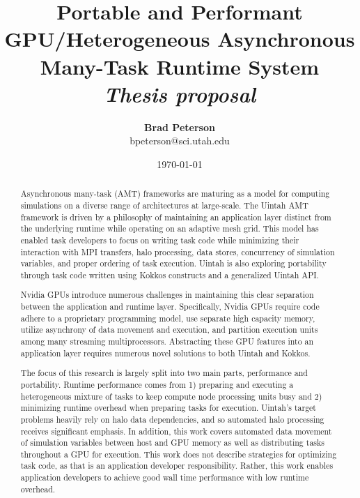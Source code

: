 \documentclass[12pt]{article}
\title{{\bf Portable and Performant GPU/Heterogeneous Asynchronous Many-Task Runtime System} \\
\it Thesis proposal}
\author{ {\bf Brad Peterson}  \\
{\small bpeterson@sci.utah.edu}
}
\date{\today}
\begin{document}
\pagestyle{plain}
\maketitle

\pagebreak
\begin{abstract}

Asynchronous many-task (AMT) frameworks are maturing as a model for computing simulations on a diverse range of architectures at large-scale.  The Uintah AMT framework is driven by a philosophy of maintaining an application layer distinct from the underlying runtime while operating on an adaptive mesh grid.  This model has enabled task developers to focus on writing task code while minimizing their interaction with MPI transfers, halo processing, data stores, concurrency of simulation variables, and proper ordering of task execution.   Uintah is also exploring portability through task code written using Kokkos constructs and a generalized Uintah API.  

Nvidia GPUs introduce numerous challenges in maintaining this clear separation between the application and runtime layer.  Specifically, Nvidia GPUs require code adhere to a proprietary programming model, use separate high capacity memory, utilize asynchrony of data movement and execution, and partition execution units among many streaming multiprocessors.  Abstracting these GPU features into an application layer requires numerous novel solutions to both Uintah and Kokkos.  

The focus of this research is largely split into two main parts, performance and portability.  Runtime performance comes from 1) preparing and executing a heterogeneous mixture of tasks to keep compute node processing units busy and 2) minimizing runtime overhead when preparing tasks for execution.  Uintah's target problems heavily rely on halo data dependencies, and so automated halo processing receives significant emphasis.  In addition, this work covers automated data movement of simulation variables between host and GPU memory as well as distributing tasks throughout a GPU for execution.   This work does not describe strategies for optimizing task code, as that is an application developer responsibility.  Rather, this work enables application developers to achieve good wall time performance with low runtime overhead.   


\end{abstract}
\end{document}
